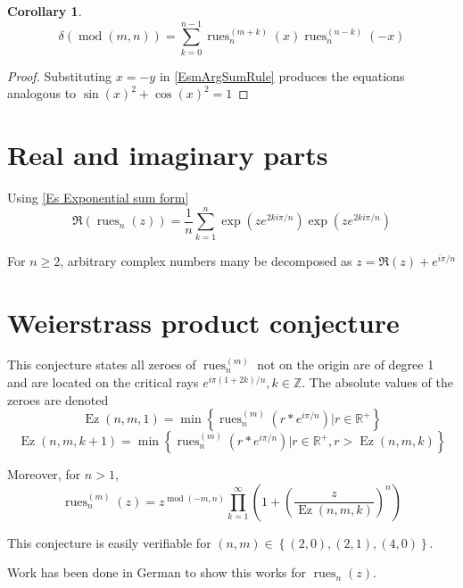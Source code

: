 \documentclass[]{article}
\DeclareMathOperator{\rues}{rues}
\DeclareMathOperator{\ez}{Ez}
\DeclareMathOperator{\md}{mod}
\newcommand{\pqty}[1]{{\left(#1\right)}}
\newcommand{\Bqty}[1]{{\left\{#1\right\}}}
\newtheorem{corollary}[theorem]{Corollary}
\numberwithin{equation}{section}
\begin{document}
	\begin{corollary}
		\begin{equation}
		\delta\pqty{\md\pqty{m,n}}=
		\sum_{k=0}^{n-1}
		\rues_n^{(m+k)}\pqty{x}
		\rues_n^{(n-k)}\pqty{-x}
		\end{equation}
	\end{corollary}
	\begin{proof}
		Substituting $x=-y$ in \eqref{EsmArgSumRule} produces the equations analogous to $\sin\pqty{x}^2 + \cos\pqty{x}^2=1$
	\end{proof}

	\section{Real and imaginary parts}
	Using \eqref{Es Exponential sum form}
	\begin{equation}
	\Re\pqty{\rues_n\pqty{z}}=
	\frac{1}{n}\sum _{k=1}^n \exp\pqty{ze^{2ki\pi/n}}\exp\pqty{ze^{2ki\pi/n}}
	\end{equation}
	
	For $n\geq 2$, arbitrary complex numbers many be decomposed as $z=\Re\pqty{z}+e^{i\pi/n}$
	
	\section{Weierstrass product conjecture}
	This conjecture states all zeroes of $\rues_n^{(m)}$ not on the origin are of degree 1 and are located on the critical rays $e^{i\pi(1+2k)/n}, k\in\mathbb{Z}$.
	The absolute values of the zeroes are denoted
	\begin{equation}
	\ez\pqty{n,m,1}=\min\Bqty{\rues_n^{(m)}\pqty{r*e^{i\pi/n}}\Big\vert r\in\mathbb{R}^+}
	\end{equation}
	\begin{equation}
	\ez\pqty{n,m,k+1}=\min\Bqty{\rues_n^{(m)}\pqty{r*e^{i\pi/n}}\Big\vert r\in\mathbb{R}^+, r>\ez\pqty{n,m,k}}
	\end{equation}
	
	Moreover, for $n>1$,
	\begin{equation}
	\rues_n^{(m)}\pqty{z}=z^{\md\pqty{-m,n}}\prod_{k=1}^{\infty}\pqty{1+\pqty{\frac{z}{\ez\pqty{n,m,k}}}^n}
	\end{equation}
	
	This conjecture is easily verifiable for $\pqty{n,m}\in\Bqty{\pqty{2,0}, \pqty{2,1}, \pqty{4,0}}$.
	
	Work has been done in German to show this works for \(\rues_n\pqty{z}\).
	
\end{document}
